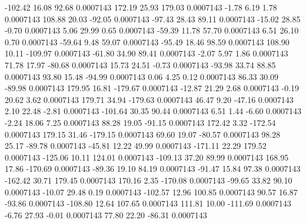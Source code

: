      -102.42       16.08       92.68     0.0007143
      172.19       25.93      179.03     0.0007143
       -1.78        6.19        1.78     0.0007143
      108.88       20.03      -92.05     0.0007143
      -97.43       28.43       89.11     0.0007143
      -15.02       28.85       -0.70     0.0007143
        5.06       29.99        0.65     0.0007143
      -59.39       11.78       57.70     0.0007143
        6.51       26.10        0.70     0.0007143
      -59.64        9.48       59.07     0.0007143
      -95.49       18.46       98.59     0.0007143
      108.90       10.11     -109.97     0.0007143
      -61.80       34.90       89.41     0.0007143
       -2.07        5.97        1.86     0.0007143
       71.78       17.97      -80.68     0.0007143
       15.73       24.51       -0.73     0.0007143
      -93.98       33.74       88.85     0.0007143
       93.80       15.48      -94.99     0.0007143
        0.06        4.25        0.12     0.0007143
       86.33       30.09      -89.98     0.0007143
      179.95       16.81     -179.67     0.0007143
      -12.87       21.29        2.68     0.0007143
       -0.19       20.62        3.62     0.0007143
      179.71       34.94     -179.63     0.0007143
       46.47        9.20      -47.16     0.0007143
        2.10       22.48       -2.81     0.0007143
     -101.64       30.35       90.44     0.0007143
        6.51        1.44       -6.60     0.0007143
       -2.24       18.06        7.25     0.0007143
       88.28       19.05      -91.15     0.0007143
      172.42        3.32     -172.54     0.0007143
      179.15       31.46     -179.15     0.0007143
       69.60       19.07      -80.57     0.0007143
       98.28       25.17      -89.78     0.0007143
      -45.81       12.22       49.99     0.0007143
     -171.11       22.29      179.52     0.0007143
     -125.06       10.11      124.01     0.0007143
     -109.13       37.20       89.99     0.0007143
      168.95       17.86     -170.69     0.0007143
      -89.36       19.10       84.19     0.0007143
      -91.47       15.84       97.38     0.0007143
     -162.42       30.71      179.45     0.0007143
      170.16        2.35     -170.08     0.0007143
      -99.65       33.82       90.10     0.0007143
      -10.07       29.48        0.19     0.0007143
     -102.57       12.96      100.85     0.0007143
       90.57       16.87      -93.86     0.0007143
     -108.80       12.64      107.65     0.0007143
      111.81       10.00     -111.69     0.0007143
       -6.76       27.93       -0.01     0.0007143
       77.80       22.20      -86.31     0.0007143
